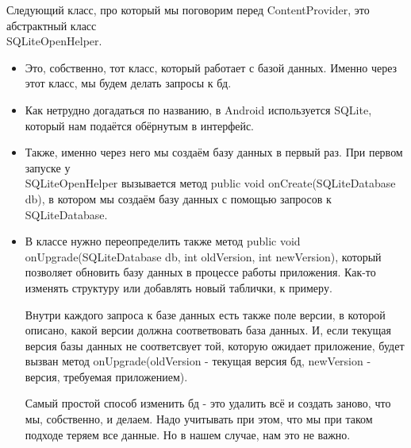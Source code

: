 \documentclass[12 pt]{article}
\begin{document}
	Следующий класс, про который мы поговорим перед ContentProvider, это абстрактный класс \\ SQLiteOpenHelper.
	\begin{itemize}
	    \item Это, собственно, тот класс, который работает с базой данных. Именно через этот класс, мы будем делать запросы к бд.
	    \item Как нетрудно догадаться по названию, в Android используется SQLite, который нам подаётся обёрнутым в интерфейс.
	    \item Также, именно через него мы создаём базу данных в первый раз. При первом запуске у \\ SQLiteOpenHelper вызывается метод public void onCreate(SQLiteDatabase db), в котором мы создаём базу данных с помощью запросов к SQLiteDatabase.
	    \item В классе нужно переопределить также метод public void onUpgrade(SQLiteDatabase db, int oldVersion, int newVersion), который позволяет обновить базу данных в процессе работы приложения. Как-то изменять структуру или добавлять новый таблички, к примеру. 
	    
	    Внутри каждого запроса к базе данных есть также поле версии, в которой описано, какой версии должна соответвовать база данных. И, если текущая версия базы данных не соответсвует той, которую ожидает приложение, будет вызван метод onUpgrade(oldVersion - текущая версия бд, newVersion - версия, требуемая приложением).
	    
	    Самый простой способ изменить бд - это удалить всё и создать заново, что мы, собственно, и делаем. Надо учитывать при этом, что мы при таком подходе теряем все данные. Но в нашем случае, нам это не важно.
	\end{itemize}
	
\end{document}
